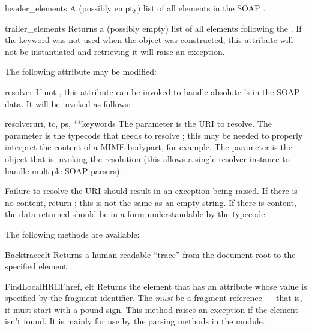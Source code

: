 \begin{memberdesc}{header_elements}
A (possibly empty) list of all elements in the SOAP .
\end{memberdesc}

\begin{memberdesc}{trailer_elements}
Returns a (possibly empty) list of all elements following the .
If the  keyword was not used when the object was
constructed, this attribute will not be instantiated and retrieving
it will raise an exception.
\end{memberdesc}

The following attribute may be modified:

\begin{memberdesc}{resolver}
If not ,
this attribute can be invoked to handle absolute 's in the SOAP data.
It will be invoked as follows:

\begin{methoddesc}{resolver}{uri, tc, ps, **keywords}
The  parameter is the URI to resolve.
The  parameter is the typecode that needs to resolve ; this
may be needed to properly interpret the content of a MIME bodypart, for example.
The  parameter is the  object that is invoking
the resolution (this allows a single resolver instance to handle multiple
SOAP parsers).

Failure to resolve the URI should result in an exception being raised.
If there is no content, return ; this is not the same as an
empty string.
If there is content, the data returned should be in a form understandable
by the typecode.
\end{methoddesc}
\end{memberdesc}

The following methods are available:

\begin{methoddesc}{Backtrace}{elt}
Returns a human-readable ``trace'' from the document root to the
specified element.
\end{methoddesc}

\begin{methoddesc}{FindLocalHREF}{href, elt}
Returns the element that has an  attribute whose value is specified
by the  fragment identifier.
The  \emph{must} be a fragment reference --- that is, it must
start with a pound sign.
This method raises an  exception if the
element isn't found.
It is mainly for use by the parsing methods in the  module.
\end{methoddesc}

